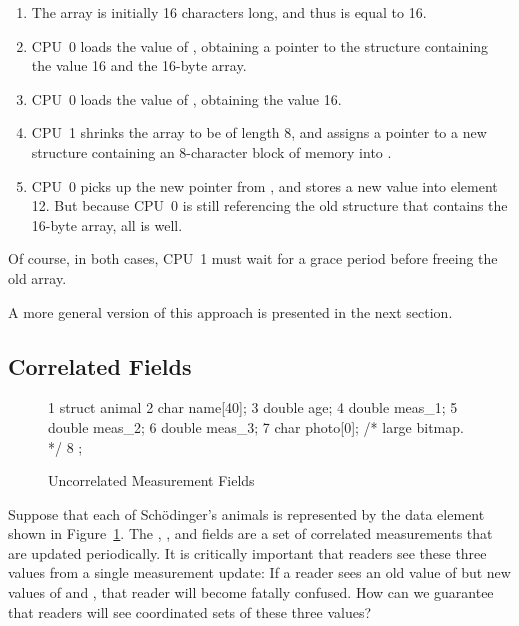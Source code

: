 \begin{enumerate}
\item	The array is initially 16 characters long, and thus 
	is equal to 16.
\item	CPU~0 loads the value of , obtaining a pointer to
	the structure containing the value 16 and the 16-byte array.
\item	CPU~0 loads the value of , obtaining the value 16.
\item	CPU~1 shrinks the array to be of length 8, and assigns a pointer
	to a new  structure containing an 8-character block
	of memory into .
\item	CPU~0 picks up the new pointer from , and stores a
	new value into element 12.
	But because CPU~0 is still referencing the old 
	structure that contains the 16-byte array, all is well.
\end{enumerate}

Of course, in both cases, CPU~1 must wait for a grace period before
freeing the old array.

A more general version of this approach is presented in the next section.

\subsection{Correlated Fields}
\label{sec:together:Correlated Fields}

\begin{figure}[tbp]
{ \scriptsize
\begin{verbbox}
 1 struct animal {
 2   char name[40];
 3   double age;
 4   double meas_1;
 5   double meas_2;
 6   double meas_3;
 7   char photo[0]; /* large bitmap. */
 8 };
\end{verbbox}
}
\centering
\theverbbox
\caption{Uncorrelated Measurement Fields}
\label{fig:together:Uncorrelated Measurement Fields}
\end{figure}

Suppose that each of Sch\"odinger's animals is represented by the
data element shown in
Figure~\ref{fig:together:Uncorrelated Measurement Fields}.
The , , and  fields are a set
of correlated measurements that are updated periodically.
It is critically important that readers see these three values from
a single measurement update: If a reader sees an old value of
 but new values of  and , that
reader will become fatally confused.
How can we guarantee that readers will see coordinated sets of these
three values?

